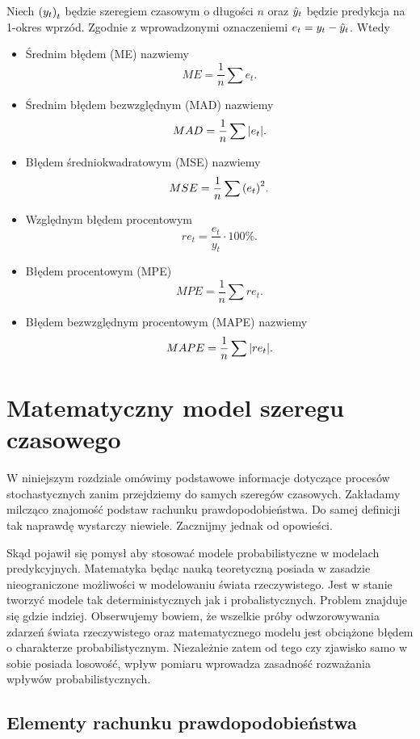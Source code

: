 \documentclass[10pt,a4paper]{book}
\begin{document}
\begin{definition}
Niech $\left( {y_t} \right)_{t}^{} $ będzie szeregiem czasowym  o długości $n$ oraz $\predict{y}{t}$ będzie predykcja na 1-okres wprzód. Zgodnie z wprowadzonymi oznaczeniemi $e_t = y_t - \predict{y}{t}$. Wtedy
\begin{itemize}
\item Średnim błędem (ME) nazwiemy 
$$
ME = \frac{1}{n} \sum  e_t.
$$
\item Średnim błędem bezwzględnym (MAD) nazwiemy 
$$
MAD = \frac{1}{n} \sum  \abs{e_t}.
$$
\item Błędem średniokwadratowym (MSE) nazwiemy 
$$
MSE = \frac{1}{n} \sum  \bracket{e_t}^2.
$$
\item Względnym błędem procentowym 
$$
re_t = \frac{e_t}{y_t} \cdot 100 \%.
$$
\item Błędem procentowym (MPE) 
$$
MPE = \frac{1}{n} \sum  re_t.
$$
\item Błędem bezwzględnym procentowym (MAPE) nazwiemy 
$$
MAPE = \frac{1}{n} \sum  \abs{re_t} .
$$
\end{itemize}
\end{definition}

\chapter{Matematyczny model szeregu czasowego}

W niniejszym rozdziale omówimy podstawowe informacje dotyczące procesów stochastycznych zanim przejdziemy do samych szeregów czasowych. Zakładamy milcząco znajomość podstaw rachunku prawdopodobieństwa. Do samej definicji tak naprawdę wystarczy niewiele. Zacznijmy jednak od opowieści.

Skąd pojawił się pomysł aby stosować modele probabilistyczne w modelach predykcyjnych. Matematyka będąc nauką teoretyczną posiada w zasadzie nieograniczone możliwości w modelowaniu świata rzeczywistego. Jest w stanie tworzyć modele tak deterministycznych jak i probalistycznych. Problem znajduje się gdzie indziej. Obserwujemy bowiem, że wszelkie próby odwzorowywania zdarzeń świata rzeczywistego oraz matematycznego modelu jest obciążone błędem o charakterze probabilistycznym. Niezależnie zatem od tego czy zjawisko samo w sobie posiada losowość, wpływ pomiaru wprowadza zasadność rozważania wpływów probabilistycznych.

\section{Elementy rachunku prawdopodobieństwa} 
 
\end{document}
